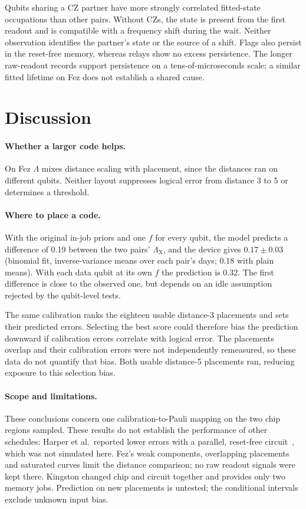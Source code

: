 \documentclass[aps,pra,reprint,nofootinbib,longbibliography,floatfix,showkeys]{revtex4-2}
\newcommand{\LX}{\Lambda_{\mathrm{X}}}
\begin{document}
Qubits sharing a CZ partner have more strongly correlated fitted-state occupations than other pairs.
Without CZs, the state is present from the first readout and is compatible with a frequency shift during the wait.
Neither observation identifies the partner's state or the source of a shift.
Flags also persist in the reset-free memory, whereas relays show no excess persistence.
The longer raw-readout records support persistence on a tens-of-microseconds scale; a similar fitted lifetime on Fez does not establish a shared cause.

\section{Discussion}
\label{sec:discussion}

\paragraph*{Whether a larger code helps.}
On Fez $\Lambda$ mixes distance scaling with placement, since the distances ran on different qubits.
Neither layout suppresses logical error from distance 3 to 5 or determines a threshold.

\paragraph*{Where to place a code.}
With the original in-job priors and one $f$ for every qubit, the model predicts a difference of 0.19 between the two pairs' $\LX$, and the device gives $0.17\pm0.03$ (binomial fit, inverse-variance means over each pair's days; 0.18 with plain means).
With each data qubit at its own $f$ the prediction is 0.32.
The first difference is close to the observed one, but depends on an idle assumption rejected by the qubit-level tests.

The same calibration ranks the eighteen usable distance-3 placements and sets their predicted errors.
Selecting the best score could therefore bias the prediction downward if calibration errors correlate with logical error.
The placements overlap and their calibration errors were not independently remeasured, so these data do not quantify that bias.
Both usable distance-5 placements ran, reducing exposure to this selection bias.

\paragraph*{Scope and limitations.}
These conclusions concern one calibration-to-Pauli mapping on the two chip regions sampled.
These results do not establish the performance of other schedules: Harper et al.\ reported lower errors with a parallel, reset-free circuit~\cite{harper2026characterising}, which was not simulated here.
Fez's weak components, overlapping placements and saturated curves limit the distance comparison; no raw readout signals were kept there.
Kingston changed chip and circuit together and provides only two memory jobs.
Prediction on new placements is untested; the conditional intervals exclude unknown input bias.
\end{document}
